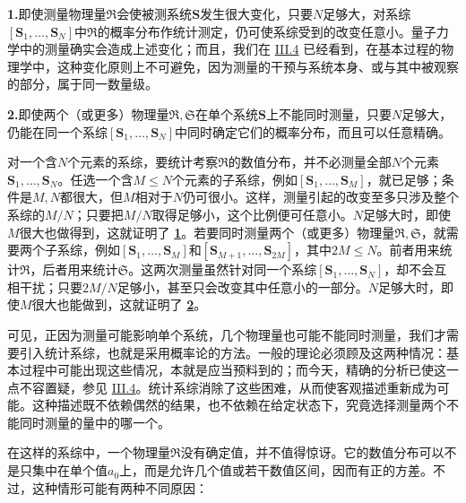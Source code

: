 \documentclass[fontsize=13pt,twoside,openany,headings=normal,parskip=false,bookmarkpackage=false,DIV=calc]{scrbook}
\begin{document}
\leavevmode{}\textbf{1.}\label{advantage:IV.1.1}即使测量物理量$\mathfrak R$会使被测系统$\boldsymbol{S}$发生很大变化，只要$N$足够大，对系综$[\boldsymbol{S}_1,\allowbreak \ldots,\allowbreak \boldsymbol{S}_N]$中$\mathfrak R$的概率分布作统计测定，仍可使系综受到的改变任意小。量子力学中的测量确实会造成上述变化；而且，我们在 \hyperref[sec:III.4]{III.4} 已经看到，在基本过程的物理学中，这种变化原则上不可避免，因为测量的干预与系统本身、或与其中被观察的部分，属于同一数量级。

\leavevmode{}\textbf{2.}\label{advantage:IV.1.2}即使两个（或更多）物理量$\mathfrak R,\allowbreak \mathfrak S$在单个系统$\boldsymbol{S}$上不能同时测量，只要$N$足够大，仍能在同一个系综$[\boldsymbol{S}_1,\allowbreak \ldots,\allowbreak \boldsymbol{S}_N]$中同时确定它们的概率分布，而且可以任意精确。

对一个含$N$个元素的系综，要统计考察$\mathfrak R$的数值分布，并不必测量全部$N$个元素$\boldsymbol{S}_1,\allowbreak \ldots,\allowbreak \boldsymbol{S}_N$。任选一个含$M\leq N$个元素的子系综，例如$[\boldsymbol{S}_1,\allowbreak \ldots,\allowbreak \boldsymbol{S}_M]$，就已足够；条件是$M,\allowbreak N$都很大，但$M$相对于$N$仍可很小。这样，测量引起的改变至多只涉及整个系综的$M/N$；只要把$M/N$取得足够小，这个比例便可任意小。$N$足够大时，即使$M$很大也做得到，这就证明了 \hyperref[advantage:IV.1.1]{\textbf{1}}。若要同时测量两个（或更多）物理量$\mathfrak R,\allowbreak \mathfrak S$，就需要两个子系综，例如$[\boldsymbol{S}_1,\allowbreak \ldots,\allowbreak \boldsymbol{S}_M]$和$[\boldsymbol{S}_{M+1},\allowbreak \ldots,\allowbreak \boldsymbol{S}_{2M}]$，其中$2M\leq N$。前者用来统计$\mathfrak R$，后者用来统计$\mathfrak S$。这两次测量虽然针对同一个系综$[\boldsymbol{S}_1,\allowbreak \ldots,\allowbreak \boldsymbol{S}_N]$，却不会互相干扰；只要$2M/N$足够小，甚至只会改变其中任意小的一部分。$N$足够大时，即使$M$很大也能做到，这就证明了 \hyperref[advantage:IV.1.2]{\textbf{2}}。

可见，正因为测量可能影响单个系统，几个物理量也可能不能同时测量，我们才需要引入统计系综，也就是采用概率论的方法。一般的理论必须顾及这两种情况：基本过程中可能出现这些情况，本就是应当预料到的；而今天，精确的分析已使这一点不容置疑，参见 \hyperref[sec:III.4]{III.4}。统计系综消除了这些困难，\hypertarget{origpage-160}{}\label{origpage-160}从而使客观描述重新成为可能。这种描述既不依赖偶然的结果，也不依赖在给定状态下，究竟选择测量两个不能同时测量的量中的哪一个。

在这样的系综中，一个物理量$\mathfrak R$没有确定值，并不值得惊讶。它的数值分布可以不是只集中在单个值$a_0$上，而是允许几个值或若干数值区间，因而有正的方差。不过，这种情形可能有两种不同原因：
\end{document}
